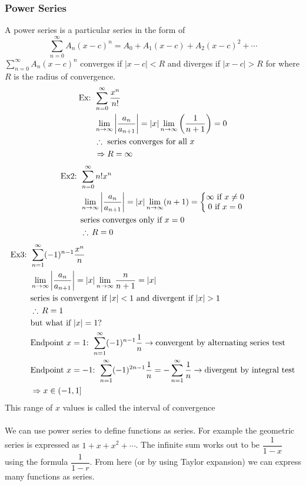 \documentclass[11pt, fleqn]{article}
\begin{document}
\subsubsection{Power Series}
A power series is a particular series in the form of
$$\sum_{n=0}^\infty A_n(x-c)^n=A_0+A_1(x-c)+A_2(x-c)^2+\cdots$$
$\displaystyle{\sum_{n=0}^\infty A_n(x-c)^n}$ converges if $|x-c|<R$ and diverges if $|x-c|>R$ for where $R$ is the radius of convergence.\\
\begin{align*}
    \text{Ex: }&\sum_{n=0}^\infty\frac{x^n}{n!}\\
    &\lim_{n\to\infty}\left| \frac{a_n}{a_{n+1}} \right|=|x|\lim_{n\to\infty}\left( \frac{1}{n+1} \right)=0\\
    &\therefore\text{ series converges for all $x$}\\
    &\Rightarrow R=\infty
\end{align*}
\begin{align*}
    \text{Ex2: }&\sum_{n=0}^\infty n!x^n\\
    &\lim_{n\to\infty}\left| \frac{a_n}{a_{n+1}} \right|=|x|\lim_{n\to\infty}(n+1)=\left\{\begin{matrix} \infty\text{ if }x\neq 0\\0\text{ if }x=0 \end{matrix}\right.\\
    &\text{series converges only if }x=0\\
    &\therefore\,R=0
\end{align*}
\begin{align*}
    \text{Ex3: }&\sum_{n=1}^\infty(-1)^{n-1}\frac{x^n}{n}\\
    &\lim_{n\to\infty}\brvertical{\frac{a_n}{a_{n+1}}}=|x|\lim_{n\to\infty}\frac{n}{n+1}=|x|\\
    &\text{series is convergent if $|x|<1$ and divergent if $|x|>1$}\\
    &\therefore\, R=1\\
    &\text{but what if $|x|=1$?}\\
    &\text{Endpoint $x=1$: }\sum_{n=1}^\infty(-1)^{n-1}\frac{1}{n}\to\text{convergent by alternating series test}\\
    &\text{Endpoint $x=-1$: }\sum_{n=1}^\infty(-1)^{2n-1}\frac{1}{n}=-\sum_{n=1}^\infty\frac{1}{n}\to\text{divergent by integral test}\\
    &\Ra x\in(-1,1]
\end{align*}
This range of $x$ values is called the interval of convergence\\
\\
We can use power series to define functions as series. For example the geometric series is expressed as ${1+x+x^2+\cdots}$. The infinite sum works out to be $\dfrac{1}{1-x}$ using the formula $\dfrac{1}{1-r}$. From here (or by using Taylor expansion) we can express many functions as series.\\
\end{document}
